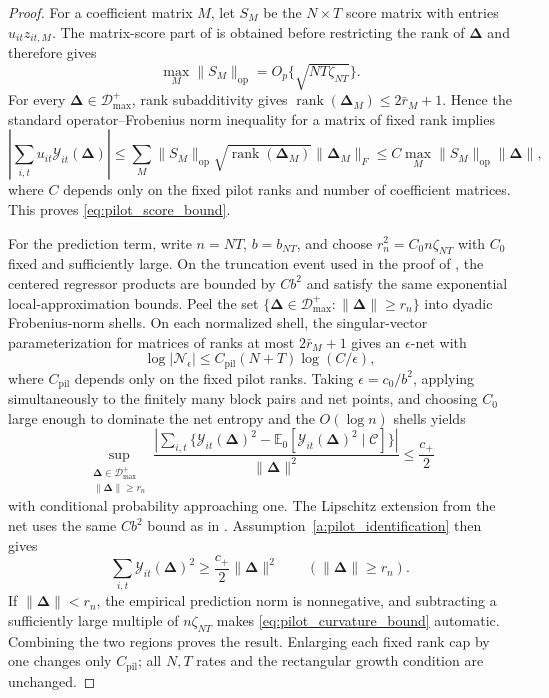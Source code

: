 \documentclass[11pt]{article}
\numberwithin{equation}{section}
\theoremstyle{remark}
\newcommand{\Ezero}{\mathbb E_0}
\newcommand{\rank}{\operatorname{rank}}
\newcommand{\op}{\operatorname{op}}
\newcommand{\bDelta}{\bm\Delta}
\newcommand{\calD}{\mathcal D}
\begin{document}
\begin{proof}
For a coefficient matrix $M$, let $S_M$ be the $N\times T$ score matrix with entries $u_{it}z_{it,M}$. The matrix-score part of  is obtained before restricting the rank of $\bDelta$ and therefore gives
\[
\max_M\|S_M\|_{\op}=O_p\{\sqrt{NT\zeta_{NT}}\}.
\]
For every $\bDelta\in\calD_{\max}^{+}$, rank subadditivity gives $\rank(\bDelta_M)\le2\bar r_M+1$. Hence the standard operator--Frobenius norm inequality for a matrix of fixed rank implies
\[
\left|\sum_{i,t}u_{it}\mathcal Y_{it}(\bDelta)\right|
\le
\sum_M\|S_M\|_{\op}\sqrt{\rank(\bDelta_M)}\|\bDelta_M\|_F
\le C\max_M\|S_M\|_{\op}\|\bDelta\|,
\]
where $C$ depends only on the fixed pilot ranks and number of coefficient matrices. This proves \eqref{eq:pilot_score_bound}.

For the prediction term, write $n=NT$, $b=b_{NT}$, and choose $r_n^2=C_0n\zeta_{NT}$ with $C_0$ fixed and sufficiently large. On the truncation event used in the proof of , the centered regressor products are bounded by $Cb^2$ and satisfy the same exponential local-approximation bounds. Peel the set $\{\bDelta\in\calD_{\max}^{+}:\|\bDelta\|\ge r_n\}$ into dyadic Frobenius-norm shells. On each normalized shell, the singular-vector parameterization for matrices of ranks at most $2\bar r_M+1$ gives an $\epsilon$-net with
\[
\log |\mathcal N_\epsilon|
\le
C_{\mathrm{pil}}(N+T)\log(C/\epsilon),
\]
where $C_{\mathrm{pil}}$ depends only on the fixed pilot ranks. Taking $\epsilon=c_0/b^2$, applying  simultaneously to the finitely many block pairs and net points, and choosing $C_0$ large enough to dominate the net entropy and the $O(\log n)$ shells yields
\[
\sup_{\substack{\bDelta\in\calD_{\max}^{+}\\\|\bDelta\|\ge r_n}}
\frac{\left|\sum_{i,t}\{\mathcal Y_{it}(\bDelta)^2-
\Ezero[\mathcal Y_{it}(\bDelta)^2\mid\mathscr C]\}\right|}{\|\bDelta\|^2}
\le
\frac{c_+}{2}
\]
with conditional probability approaching one. The Lipschitz extension from the net uses the same $Cb^2$ bound as in . Assumption~\ref{a:pilot_identification} then gives
\[
\sum_{i,t}\mathcal Y_{it}(\bDelta)^2
\ge
\frac{c_+}{2}\|\bDelta\|^2
\qquad
(\|\bDelta\|\ge r_n).
\]
If $\|\bDelta\|<r_n$, the empirical prediction norm is nonnegative, and subtracting a sufficiently large multiple of $n\zeta_{NT}$ makes \eqref{eq:pilot_curvature_bound} automatic. Combining the two regions proves the result. Enlarging each fixed rank cap by one changes only $C_{\mathrm{pil}}$; all $N,T$ rates and the rectangular growth condition are unchanged.
\end{proof}
\end{document}
